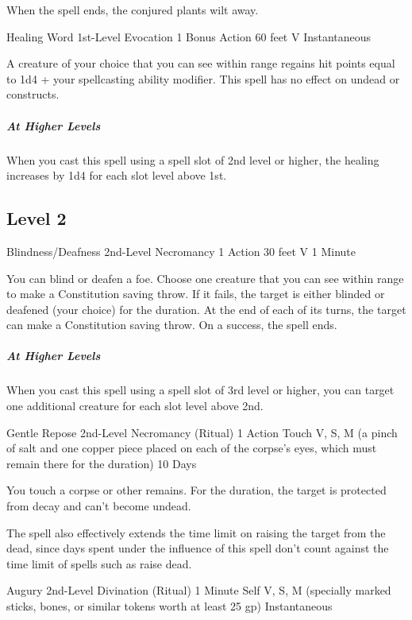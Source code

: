 {When the spell ends, the conjured plants wilt away.

\DndSpellHeader
  {Healing Word}
  {1st-Level Evocation}
  {1 Bonus Action}
  {60 feet}
  {V}
  {Instantaneous}

A creature of your choice that you can see within range regains hit points equal to 1d4 + your spellcasting ability modifier. This spell has no effect on undead or constructs.

\subparagraph*{At Higher Levels} When you cast this spell using a spell slot of 2nd level or higher, the healing increases by 1d4 for each slot level above 1st.

\subsection*{Level 2}

\DndSpellHeader
  {Blindness/Deafness}
  {2nd-Level Necromancy}
  {1 Action}
  {30 feet}
  {V}
  {1 Minute}

You can blind or deafen a foe. Choose one creature that you can see within range to make a Constitution saving throw. If it fails, the target is either blinded or deafened (your choice) for the duration. At the end of each of its turns, the target can make a Constitution saving throw. On a success, the spell ends.

\subparagraph*{At Higher Levels} When you cast this spell using a spell slot of 3rd level or higher, you can target one additional creature for each slot level above 2nd.

\DndSpellHeader
  {Gentle Repose}
  {2nd-Level Necromancy (Ritual)}
  {1 Action}
  {Touch}
  {V, S, M (a pinch of salt and one copper piece placed on each of the corpse’s eyes, which must remain there for the duration)}
  {10 Days}

You touch a corpse or other remains. For the duration, the target is protected from decay and can’t become undead.

The spell also effectively extends the time limit on raising the target from the dead, since days spent under the influence of this spell don’t count against the time limit of spells such as raise dead.

\DndSpellHeader
  {Augury}
  {2nd-Level Divination (Ritual)}
  {1 Minute}
  {Self}
  {V, S, M (specially marked sticks, bones, or similar tokens worth at least 25 gp)}
  {Instantaneous}

}
